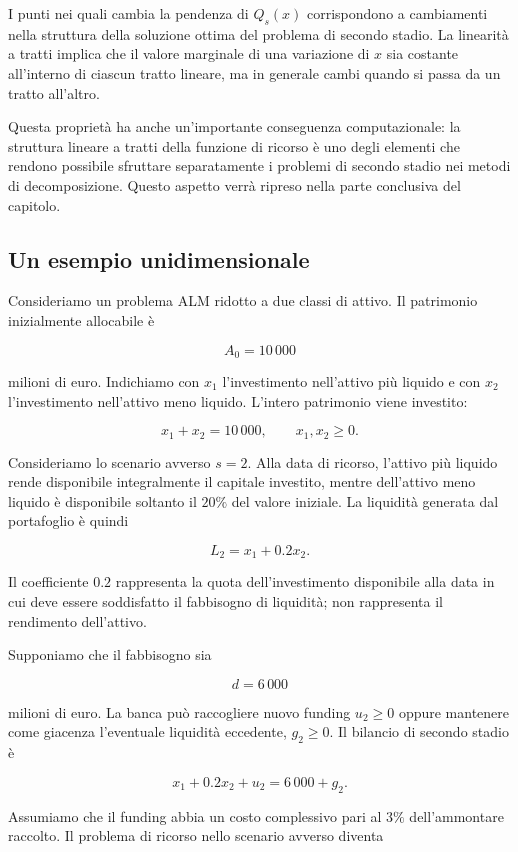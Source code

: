 I punti nei quali cambia la pendenza di $Q_s(x)$ corrispondono a cambiamenti
nella struttura della soluzione ottima del problema di secondo stadio. 
La linearit\`a a tratti implica che il valore marginale di una variazione di $x$ sia costante all'interno di ciascun tratto lineare, ma in generale cambi
quando si passa da un tratto all'altro.

Questa propriet\`a ha anche un'importante conseguenza computazionale: la
struttura lineare a tratti della funzione di ricorso \`e uno degli elementi
che rendono possibile sfruttare separatamente i problemi di secondo stadio
nei metodi di decomposizione. Questo aspetto verr\`a ripreso nella parte
conclusiva del capitolo.

\subsection{Un esempio unidimensionale}

Consideriamo un problema ALM ridotto a due classi di attivo. Il patrimonio
inizialmente allocabile \`e

\[
A_0=10\,000
\]

milioni di euro. Indichiamo con $x_1$ l'investimento nell'attivo pi\`u
liquido e con $x_2$ l'investimento nell'attivo meno liquido. L'intero
patrimonio viene investito:

\[
x_1+x_2=10\,000,
\qquad
x_1,x_2\geq0.
\]

Consideriamo lo scenario avverso $s=2$. Alla data di ricorso, l'attivo
pi\`u liquido rende disponibile integralmente il capitale investito, mentre
dell'attivo meno liquido \`e disponibile soltanto il $20\%$ del valore
iniziale. La liquidit\`a generata dal portafoglio \`e quindi

\[
L_2
=
x_1+0.2x_2.
\]

Il coefficiente $0.2$ rappresenta la quota dell'investimento disponibile
alla data in cui deve essere soddisfatto il fabbisogno di liquidit\`a; non
rappresenta il rendimento dell'attivo.

Supponiamo che il fabbisogno sia

\[
d=6\,000
\]

milioni di euro. La banca pu\`o raccogliere nuovo funding $u_2\geq0$ oppure
mantenere come giacenza l'eventuale liquidit\`a eccedente, $g_2\geq0$. Il
bilancio di secondo stadio \`e

\[
x_1+0.2x_2+u_2
=
6\,000+g_2.
\]

Assumiamo che il funding abbia un costo complessivo pari al $3\%$
dell'ammontare raccolto. Il problema di ricorso nello scenario avverso
diventa

